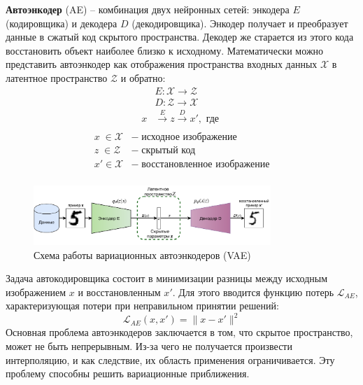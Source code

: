 \documentclass[11pt,a4paper]{extarticle}
\begin{document}
			\textbf{Автоэнкодер} (AE) -- комбинация двух нейронных сетей: энкодера $E$ (кодировщика) и декодера $D$ (декодировщика).
			Энкодер получает и преобразует данные в сжатый код скрытого пространства.
			Декодер же старается из этого кода восстановить объект наиболее близко к исходному.
			Математически можно представить автоэнкодер как отображения пространства входных данных $\mathcal{X}$ в латентное пространство $\mathcal{Z}$ и обратно:
			\begin{equation}
				\begin{aligned} 
					& E\!:{\mathcal{X}}\rightarrow {\mathcal{Z}} \\
					& D\!:{\mathcal{Z}}\rightarrow {\mathcal{X}} \\
					x& \xrightarrow[]{E} z \xrightarrow[]{D} x', \text{ где }
				\end{aligned}
			\end{equation}
			\begin{equation*}
				\begin{array}{ll}
					x\;\in \mathcal{X}&-\;\text{исходное изображение}\\
					z\;\in \mathcal{Z}&-\;\text{скрытый код}\\
					x' \in \mathcal{X}&-\;\text{восстановленное изображение}\\
				\end{array} 
			\end{equation*}

			\begin{figure}[ht]
				\centering
				\includegraphics[width=0.8\textwidth]{img/vae}
				\caption{Схема работы вариационных автоэнкодеров (VAE)}
				\label{fig:vae}
			\end{figure}
			\noindent
			Задача автокодировщика состоит в минимизации разницы между исходным изображением $x$ и восстановленным $x'$.
			Для этого вводится функцию потерь $\mathcal{L}_{AE}$, характеризующая потери при неправильном принятии решений:
			\begin{equation} \label{eq:ae}
				\mathcal{L}_{AE}(x,x') = \|x - x'\|^{2}
			\end{equation}
			Основная проблема автоэнкодеров заключается в том, что скрытое пространство, может не быть непрерывным.
			Из-за чего не получается произвести интерполяцию, и как следствие, их область применения ограничивается.
			Эту проблему способны решить вариационные приближения.
	
\end{document}
